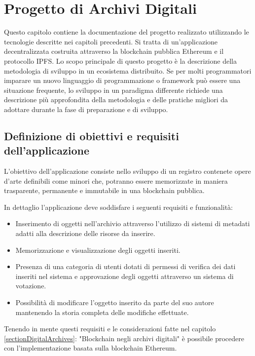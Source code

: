 \chapter{Progetto di Archivi Digitali}
\label{ch:archivi}

Questo capitolo contiene la documentazione del progetto realizzato utilizzando le tecnologie descritte nei capitoli precedenti. Si tratta di un’applicazione decentralizzata costruita attraverso la blockchain pubblica Ethereum e il protocollo IPFS. Lo scopo principale di questo progetto è la descrizione della metodologia di sviluppo in un ecosistema distribuito. Se per molti programmatori imparare un nuovo linguaggio di programmazione o framework può essere una situazione frequente, lo sviluppo in un paradigma differente richiede una descrizione più approfondita della metodologia e delle pratiche migliori da adottare durante la fase di preparazione e di sviluppo.

\section{Definizione di obiettivi e requisiti dell’applicazione}

L’obiettivo dell'applicazione consiste nello sviluppo di un registro contenete opere d’arte definibili come minori che, potranno essere memorizzate in maniera trasparente, permanente e immutabile in una blockchain pubblica.

In dettaglio l’applicazione deve soddisfare i seguenti requisiti e funzionalità:

\begin{itemize}
\item Inserimento di oggetti nell’archivio attraverso l’utilizzo di sistemi di metadati adatti alla descrizione delle risorse da inserire.
\item Memorizzazione e visualizzazione degli oggetti inseriti.
\item Presenza di una categoria di utenti dotati di permessi di verifica dei dati inseriti nel sistema e approvazione degli oggetti attraverso un sistema di votazione.
\item Possibilità di modificare l’oggetto inserito da parte del suo autore mantenendo la storia completa delle modifiche effettuate.
\end{itemize}

Tenendo in mente questi requisiti e le considerazioni fatte nel capitolo \ref{sectionDigitalArchives}: "Blockchain negli archivi digitali" è possibile procedere con l'implementazione basata sulla blockchain Ethereum.

